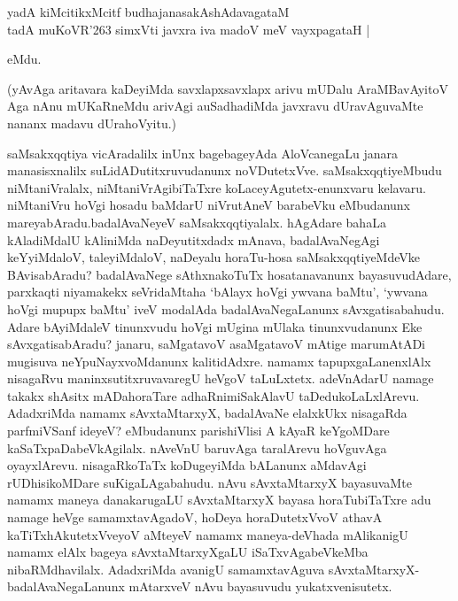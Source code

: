 \medskip
 
 \begin{shloka}
yadA kiMcitikxMcitf budhajanasakAshAdavagataM \\
tadA muKoVR\char'263 simxVti javxra iva madoV meV vayxpagataH |\\
 \end{shloka}
eMdu.

\newpage

 \noindent
(yAvAga aritavara kaDeyiMda savxlapxsavxlapx arivu mUDalu AraMBavAyitoV Aga nAnu mUKaR\-neMdu arivAgi auSadhadiMda javxravu dUravAguvaMte nananx madavu dUrahoVyitu.)

saMsakxqqtiya vicAradalilx inUnx bagebageyAda AloVcane\-gaLu janara manasisx\-nalilx suLidADutitxruvudanunx noVDutetxVve. saMsakxqqti\-yeMbudu niMtaniVralalx, niMtaniVrAgibiTaTxre koLace\-yAgutetx-\-enunxvaru kelavaru. niMta\-niVru hoVgi hosadu baMdarU niVrutAneV barabeVku eMbu\-danunx mareyabAradu.\break badalAvaNeyeV saMsakxqqtiyalalx. hAgAdare bahaLa kAla\-diMdalU kAliniMda naDe\-yutitxdadx mAnava, badalAvaNegAgi keYyiMdaloV, taleyiMdaloV, naDeyalu horaTu-hosa saMsakxqqtiyeMdeVke BAvisabAradu? badalAvaNege sAthxnakoTuTx hosatanavanunx bayasuvudAdare, parxkaqti niyamakekx seVridaMtaha `bAlayx hoVgi ywvana baMtu', `ywvana hoVgi mupupx baMtu' iveV moda\-lAda badalA\-vaNe\-gaLanunx sAvxgatisabahudu. Adare bAyiMdaleV tinunxvudu hoVgi mUgina\- mUlaka\- tinunx\-vudanunx Eke sAvxgatisabAradu? janaru, saMgatavoV asaMgatavoV mAtige marumAtADi mugisuva neYpuNayxvoMdanunx kalitidAdxre. namamx tapupxgaLanenxlAlx nisagaRvu maninxsutitxruvavaregU heVgoV taLuLxtetx. adeVnAdarU namage takakx shAsitx mADahoraTare adhaRnimiSakAlavU taDedukoLaLxlArevu. AdadxriMda namamx sAvxtaMtarxyX, badalAvaNe elalxkUkx nisagaRda parfmiVSanf ideyeV? eMbu\-danunx pari\-shiVlisi A kAyaR\- keYgoMDare kaSaTxpaDabeVkAgilalx. nAveVnU baruvAga taralArevu hoVguvAga oyayxlArevu. nisagaRkoTaTx koDugeyiMda bALanunx aMdavAgi rUDhisikoMDare suKigaLAgabahudu. nAvu sAvxtaMtarxyX bayasuvaMte namamx maneya danakarugaLU sAvxtaMtarxyX bayasa horaTubiTaTxre adu namage heVge samamxta\-vAgadoV, hoDeya horaDutetxVvoV athavA kaTiTxhAkutetxVveyoV aMteyeV namamx maneya-deVhada mAlikanigU namamx elAlx bageya sAvxtaMtarxyXgaLU iSaTxvAgabeVkeMba \-nibaRMdhavilalx. AdadxriMda avanigU samamxtavAguva sAvxtaMtarxyX-badalAvaNegaLanunx mAtarxveV nAvu bayasuvudu yukatxvenisutetx.

